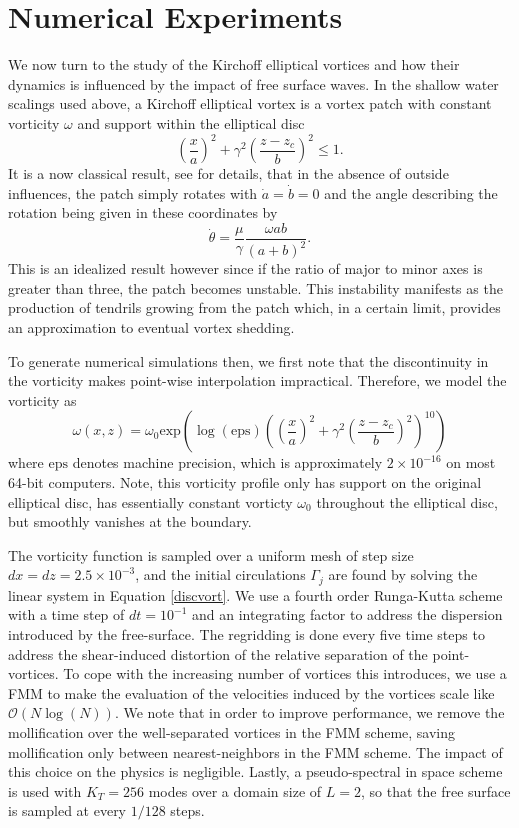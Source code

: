 \documentclass[a4paper,11pt]{article}
\begin{document}
\section*{Numerical Experiments}
We now turn to the study of the Kirchoff elliptical vortices \cite{mitchell,crosby} and how their dynamics is influenced by the impact of free surface waves.  In the shallow water scalings used above, a Kirchoff elliptical vortex is a vortex patch with constant vorticity $\omega$ and support within the elliptical disc
\[
\left(\frac{x}{a}\right)^{2} + \gamma^{2}\left(\frac{z-z_{c}}{b} \right)^{2} \leq 1.
\]
It is a now classical result, see \cite{mitchell} for details, that in the absence of outside influences, the patch simply rotates with $\dot{a}=\dot{b}=0$ and the angle describing the rotation being given in these coordinates by 
\[
\dot{\theta} = \frac{\mu}{\gamma} \frac{\omega ab}{(a+b)^{2}}.
\]
This is an idealized result however since if the ratio of major to minor axes is greater than three, the patch becomes unstable.  This instability manifests as the production of tendrils growing from the patch which, in a certain limit, provides an approximation to eventual vortex shedding.  

To generate numerical simulations then, we first note that the discontinuity in the vorticity makes point-wise interpolation impractical.  Therefore, we model the vorticity as 
\[
\omega(x,z) = \omega_{0}\mbox{exp}\left(\log(\mbox{eps}) \left(\left(\frac{x}{a}\right)^{2} + \gamma^{2}\left(\frac{z-z_{c}}{b} \right)^{2}\right)^{10}\right)
\]
where $\mbox{eps}$ denotes machine precision, which is approximately $2\times 10^{-16}$ on most 64-bit computers.  Note, this vorticity profile only has support on the original elliptical disc, has essentially constant vorticty $\omega_{0}$ throughout the elliptical disc, but smoothly vanishes at the boundary.  

The vorticity function is sampled over a uniform mesh of step size $dx = dz = 2.5 \times 10^{-3}$, and the initial circulations $\Gamma_{j}$ are found by solving the linear system in Equation \eqref{discvort}.  We use a fourth order Runga-Kutta scheme with a time step of $dt = 10^{-1}$ and an integrating factor to address the dispersion introduced by the free-surface.  The regridding is done every five time steps to address the shear-induced distortion of the relative separation of the point-vortices.  To cope with the increasing number of vortices this introduces, we use a FMM to make the evaluation of the velocities induced by the vortices scale like $\mathcal{O}(N\log(N))$.  We note that in order to improve performance, we remove the mollification over the well-separated vortices in the FMM scheme, saving mollification only between nearest-neighbors in the FMM scheme.  The impact of this choice on the physics is negligible.  Lastly, a pseudo-spectral in space scheme is used with $K_{T}=256$ modes over a domain size of $L=2$, so that the free surface is sampled at every $1/128$ steps.   
\end{document}
